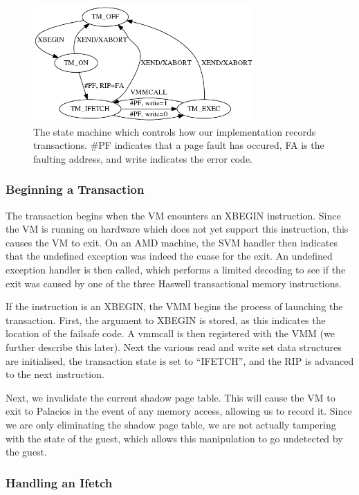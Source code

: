 \documentclass{acm_proc_article-sp}
\begin{document}
\begin{figure}[t]
\centering
\includegraphics[height=1.75in]{figs/fsm.png}
\caption{The state machine which controls how our implementation records 
transactions. \#PF indicates that a page fault has occured, FA is the faulting
address, and write indicates the error code.}
\label{flowchart}
\end{figure}
\subsubsection{Beginning a Transaction}

The transaction begins when the VM enounters an XBEGIN instruction. Since the 
VM is running on hardware which does not yet support this instruction, this
causes the VM to exit. On an AMD machine, the SVM handler then indicates that
the undefined exception was indeed the cuase for the exit. An undefined 
exception handler is then called, which performs a limited decoding to see
if the exit was caused by one of the three Haswell transactional memory
instructions.    

If the instruction is an XBEGIN, the VMM begins the process of launching the
transaction. First, the argument to XBEGIN is stored, as this indicates the 
location of the failsafe code. A vmmcall is then registered with the VMM
(we further describe this later). Next the various read and write set data
structures are initialised, the transaction state is set to ``IFETCH'', and the
RIP is advanced to the next instruction.

Next, we invalidate the current shadow page table. This will cause the VM to 
exit to Palacios in the event of any memory access, allowing us to record it.
Since we are only eliminating the shadow page table, we are not actually
tampering with the state of the guest, which allows this manipulation to go
undetected by the guest.

\subsubsection{Handling an Ifetch}
\end{document}

